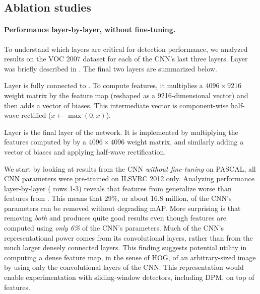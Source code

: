 \subsection{Ablation studies}
\paragraph{Performance layer-by-layer, without fine-tuning.}
To understand which layers are critical for detection performance, we analyzed results on the VOC 2007 dataset for each of the CNN's last three layers.
Layer  was briefly described in .
The final two layers are summarized below.

Layer  is fully connected to . To compute features,
it multiplies a $4096 \times 9216$ weight matrix by the  feature map 
(reshaped as a 9216-dimensional vector) and then adds a vector of
biases. 
This intermediate vector is component-wise half-wave rectified ($x \leftarrow \max(0, x)$).

Layer  is the final layer of the network. It is implemented
by multiplying the features computed by  by a $4096 \times 4096$
weight matrix, and similarly adding a vector of biases and 
applying half-wave rectification.

We start by looking at results from the CNN \emph{without fine-tuning} on PASCAL, \ie all CNN parameters were pre-trained on ILSVRC 2012 only.
Analyzing performance layer-by-layer ( rows 1-3) reveals that
features from  generalize worse than 
features from . This means that 29\%, or about 16.8 million,
of the CNN's parameters can be removed without degrading mAP. 
More surprising is that removing \emph{both}  and
 produces quite good results even though 
features are computed using \emph{only 6\%}
of the CNN's parameters. Much of the
CNN's representational power comes from its convolutional layers,
rather than from the much larger densely connected layers. This finding
suggests potential utility in computing a dense feature map,
in the sense of HOG, of an arbitrary-sized image by using only the convolutional layers
of the CNN. This representation would enable experimentation with sliding-window detectors,
including DPM, on top of  features.


